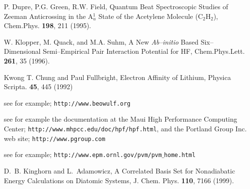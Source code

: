 \begin{thebibliography}{999}
P. Dupre, P.G. Green, R.W. Field, 
Quantum Beat Spectroscopic Studies of Zeeman Anticrossing
in the A$^1_u$ State of the Acetylene Molecule
(C$_2$H$_2$),
Chem.Phys. {\bf 198}, 211 (1995). 

W. Klopper, M. Quack, and M.A. Suhm,
A New {\it Ab--initio} Based Six--Dimensional Semi--Empirical Pair
Interaction Potential for HF,
Chem.Phys.Lett. {\bf 261}, 35 (1996).

Kwong T. Chung and Paul Fullbright,
Electron Affinity of Lithium,
Physica Scripta. {\bf 45}, 445 (1992)

see for example; {\tt http://www.beowulf.org}

see for example the documentation at the 
Maui High Performance Computing Center;
{\tt http://www.mhpcc.edu/doc/hpf/hpf.html},
and the Portland Group Inc. web site;
{\tt http://www.pgroup.com}

see for example; 
{\tt http://www.epm.ornl.gov/pvm/pvm$\_$home.html}

D.~B. Kinghorn and L.~Adamowicz,
A Correlated Basis Set for Nonadiabatic Energy Calculations
on Diatomic Systems,
J. Chem. Phys. {\bf 110}, 7166 (1999).


\end{thebibliography}




